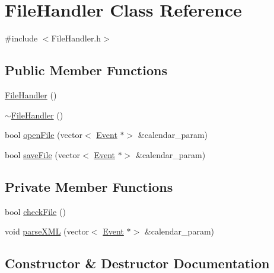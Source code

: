 \hypertarget{class_file_handler}{}\section{File\+Handler Class Reference}
\label{class_file_handler}


{\ttfamily \#include $<$File\+Handler.\+h$>$}

\subsection*{Public Member Functions}
\begin{DoxyCompactItemize}
\item 
\hyperlink{class_file_handler_a0d1ac8e9911e19255e8b2d99c2d93f43}{File\+Handler} ()
\item 
\hyperlink{class_file_handler_a1ce10cd0ad31b313a8d526fba6f1e676}{$\sim$\+File\+Handler} ()
\item 
bool \hyperlink{class_file_handler_aafa501a072bedae110a41b984811c83e}{open\+File} (vector$<$ \hyperlink{class_event}{Event} $\ast$$>$ \&calendar\+\_\+param)
\item 
bool \hyperlink{class_file_handler_a612156e5c57cf3086d9b03ae7446df9b}{save\+File} (vector$<$ \hyperlink{class_event}{Event} $\ast$$>$ \&calendar\+\_\+param)
\end{DoxyCompactItemize}
\subsection*{Private Member Functions}
\begin{DoxyCompactItemize}
\item 
bool \hyperlink{class_file_handler_a9c5150acc7f815f70779198b6253a537}{check\+File} ()
\item 
void \hyperlink{class_file_handler_a1ac7349befc2f28e3b84f4628cb34dd1}{parse\+X\+ML} (vector$<$ \hyperlink{class_event}{Event} $\ast$$>$ \&calendar\+\_\+param)
\end{DoxyCompactItemize}


\subsection{Constructor \& Destructor Documentation}
\mbox{\label{class_file_handler_a0d1ac8e9911e19255e8b2d99c2d93f43}} 
